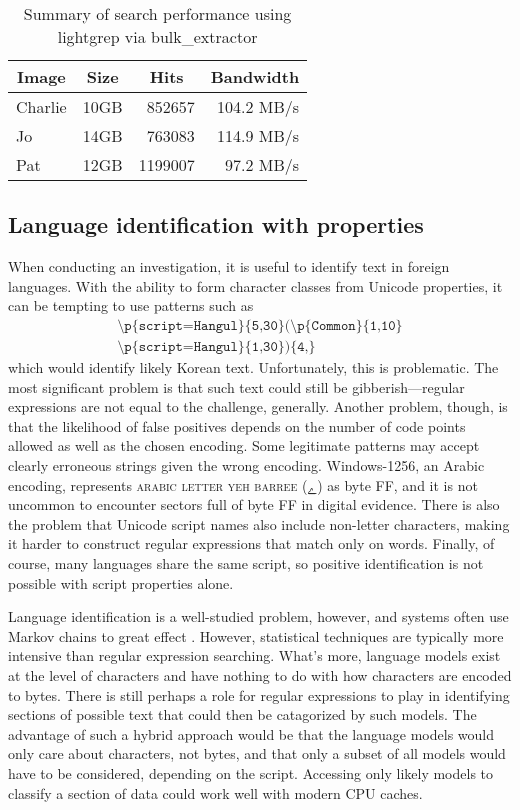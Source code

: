 \documentclass[5p,final,number,sort&compress]{elsarticle}
\newcommand{\re}[1]{\texttt{#1}}
\newcommand*{\whack}{\textbackslash}
\begin{document}
\begin{table}
\centering
\small
\begin{tabular}{lrrr}
  \multicolumn{1}{c}{Image} & \multicolumn{1}{c}{Size} & \multicolumn{1}{c}{Hits} & \multicolumn{1}{c}{Bandwidth} \\
  \hline
  Charlie & 10GB &  852657 & 104.2 MB/s \\
  Jo      & 14GB &  763083 & 114.9 MB/s \\
  Pat     & 12GB & 1199007 & 97.2 MB/s  \\
  \hline
\end{tabular}
\caption{Summary of search performance using lightgrep via bulk\_extractor\label{table:experiment}}
\end{table}

\subsection{Language identification with properties}

When conducting an investigation, it is useful to identify text in foreign languages. With the ability to form character classes from Unicode properties, it can be tempting to use patterns such as
\begin{multline*}
  \re{\whack p\{script=Hangul\}\{5,30\}(\whack p\{Common\}\{1,10\}}\\
    \re{\whack p\{script=Hangul\}\{1,30\})\{4,\}}
\end{multline*}
which would identify likely Korean text. Unfortunately, this is problematic. The most significant problem is that such text could still be gibberish---regular expressions are not equal to the challenge, generally. Another problem, though, is that the likelihood of false positives depends on the number of code points allowed as well as the chosen encoding. Some legitimate patterns may accept clearly erroneous strings given the wrong encoding. Windows-1256, an Arabic encoding, represents \textsc{arabic letter yeh barree} ({ے}) as byte FF, and it is not uncommon to encounter sectors full of byte FF in digital evidence. There is also the problem that Unicode script names also include non-letter characters, making it harder to construct regular expressions that match only on words. Finally, of course, many languages share the same script, so positive identification is not possible with script properties alone.

Language identification is a well-studied problem, however, and systems often use Markov chains to great effect \citep{brownlang}. However, statistical techniques are typically more intensive than regular expression searching. What's more, language models exist at the level of characters and have nothing to do with how characters are encoded to bytes. There is still perhaps a role for regular expressions to play in identifying sections of possible text that could then be catagorized by such models. The advantage of such a hybrid approach would be that the language models would only care about characters, not bytes, and that only a subset of all models would have to be considered, depending on the script. Accessing only likely models to classify a section of data could work well with modern CPU caches.
\end{document}
